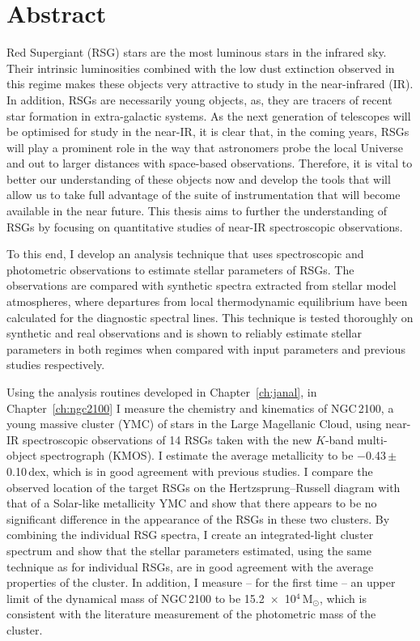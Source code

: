 \chapter{Abstract}

Red Supergiant (RSG) stars are the most luminous stars in the infrared sky.
Their intrinsic luminosities combined with the low dust extinction observed
in this regime makes these objects very attractive to study in the near-infrared (IR).
In addition, RSGs are necessarily young objects,
as, they are tracers of recent star formation in extra-galactic
systems.
As the next generation of telescopes will be optimised for study in the near-IR,
it is clear that, in the coming years, RSGs will play a prominent role in the way that astronomers probe the local Universe and out to larger distances with
space-based observations.
Therefore, it is vital to better our understanding of these objects now and develop the
tools that will allow us to take full advantage of the suite of instrumentation
that will become available in the near future.
This thesis aims to further the understanding of RSGs by focusing on quantitative studies of near-IR spectroscopic observations.

To this end, I develop an analysis technique that uses spectroscopic and photometric observations to estimate stellar parameters of RSGs.
The observations are compared with synthetic spectra extracted from stellar model atmospheres, where departures from local thermodynamic equilibrium have been calculated for the diagnostic spectral lines.
This technique is tested thoroughly on synthetic and real observations and is shown to reliably estimate stellar parameters in both regimes when compared with input parameters and previous studies respectively.


Using the analysis routines developed in Chapter~\ref{ch:janal}, in Chapter~\ref{ch:ngc2100} I measure the chemistry and kinematics of NGC\,2100, a young massive cluster (YMC) of stars in the Large Magellanic Cloud, using near-IR spectroscopic observations of 14 RSGs taken with the new $K$-band multi-object spectrograph (KMOS).
I estimate the average metallicity to be $-$0.43\,$\pm$\,0.10\,dex, which is in good agreement with previous studies.
I compare the observed location of the target RSGs on the Hertzsprung--Russell diagram with that of a Solar-like metallicity YMC and show that there appears to be no significant difference in the appearance of the RSGs in these two clusters.
By combining the individual RSG spectra, I create an integrated-light cluster spectrum and show that the stellar parameters estimated, using the same technique as for individual RSGs, are in good agreement with the average properties of the cluster.
In addition, I measure -- for the first time -- an upper limit of the dynamical mass of NGC\,2100 to be 15.2~$\times$~10$^4$\,M$_{\odot}$, which is consistent with the literature measurement of the photometric mass of the cluster.


